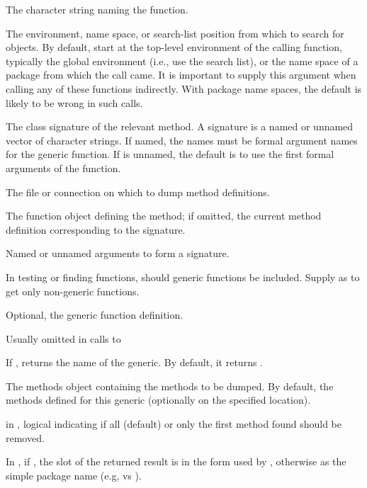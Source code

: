 \begin{Arguments}
\begin{ldescription}
\item[\code{f}]  The character string naming the function. 
\item[\code{where}]  The environment, name space, or search-list position
from which to search for objects.  By default, start at the
top-level environment of the calling function, typically the global
environment (i.e., use the search list), or the name space of a
package from which the call came.  It is important to supply this
argument when calling any of these functions indirectly.  With
package name spaces, the default is likely to be wrong in such calls.

\item[\code{signature}]  The class signature of the relevant method.  A
signature is a named or unnamed vector of character strings.  If
named, the names must be formal argument names for the generic
function.  If  is unnamed, the default is to use
the first  formal arguments of the
function. 

\item[\code{file}]  The file or connection on which to dump method definitions. 

\item[\code{def}]  The function object defining the method; if omitted, the
current method definition corresponding to the signature. 

\item[\code{...}] Named or unnamed arguments to form a signature.

\item[\code{generic}] In testing or finding functions, should generic
functions be included.  Supply as  to get only
non-generic functions.

\item[\code{fdef}] Optional, the generic function definition.

Usually omitted in calls to 

\item[\code{getName}] If ,  returns the name of
the generic.  By default, it returns . 
\item[\code{methods}] 
The methods object containing the methods to be dumped.  By default,
the methods defined for this generic (optionally on the specified
 location).

\item[\code{all}] in , logical indicating if all
(default) or only the first method found should be removed.
\item[\code{searchForm}] In , if , the
 slot of the returned result is in the form used
by , otherwise as the simple package name (e.g,
 vs ).

\end{ldescription}
\end{Arguments}
